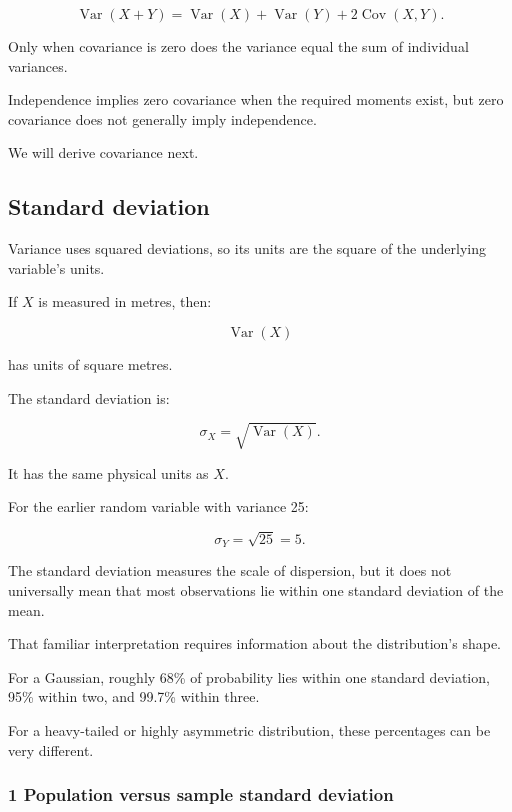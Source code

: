 \[
 \operatorname{Var}(X+Y) = \operatorname{Var}(X)+ \operatorname{Var}(Y)+ 2\operatorname{Cov}(X,Y).
\]

Only when covariance is zero does the variance equal the sum of individual variances.

Independence implies zero covariance when the required moments exist, but zero covariance does not generally imply independence.

We will derive covariance next.

\subsection{Standard deviation}\label{02-foundations-ii-ch023-standard-deviation}

\hypertarget{02-foundations-ii-ch023-standard-deviation}{}

Variance uses squared deviations, so its units are the square of the underlying variable's units.

If \(X\) is measured in metres, then:

\[
 \operatorname{Var}(X)
\]

has units of square metres.

The standard deviation is:

\[
 \boxed{ \sigma_X=\sqrt{\operatorname{Var}(X)} }.
\]

It has the same physical units as \(X\).

For the earlier random variable with variance 25:

\[
 \sigma_Y=\sqrt{25}=5.
\]

The standard deviation measures the scale of dispersion, but it does not universally mean that most observations lie within one standard deviation of the mean.

That familiar interpretation requires information about the distribution's shape.

For a Gaussian, roughly 68\% of probability lies within one standard deviation, 95\% within two, and 99.7\% within three.

For a heavy-tailed or highly asymmetric distribution, these percentages can be very different.

\subsubsection{1 Population versus sample standard deviation}\label{02-foundations-ii-ch023-population-versus-sample-standard-deviation}

